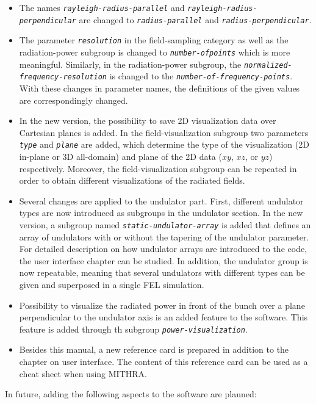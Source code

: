\begin{itemize}
	\item The names {\tt \em \small rayleigh-radius-parallel} and {\tt \em \small rayleigh-radius-perpendicular} are changed to {\tt \em \small radius-parallel} and {\tt \em \small radius-perpendicular}.
	\item The parameter {\tt \em \small resolution} in the field-sampling category as well as the radiation-power subgroup is changed to {\tt \em \small number-of\-points} which is more meaningful. Similarly, in the radiation-power subgroup, the {\tt \em \small normalized-frequency-resolution} is changed to the {\tt \em \small number-of-frequency-points}. With these changes in parameter names, the definitions of the given values are correspondingly changed.
	\item In the new version, the possibility to save 2D visualization data over Cartesian planes is added. In the field-visualization subgroup two parameters {\tt \em \small type} and {\tt \em \small plane} are added, which determine the type of the visualization (2D in-plane or 3D all-domain) and plane of the 2D data ($xy$, $xz$, or $yz$) respectively. Moreover, the field-visualization subgroup can be repeated in order to obtain different visualizations of the radiated fields.
	\item Several changes are applied to the undulator part. First, different undulator types are now introduced as subgroups in the undulator section. In the new version, a subgroup named {\em \tt \small static-undulator-array} is added that defines an array of undulators with or without the tapering of the undulator parameter. For detailed description on how undulator arrays are introduced to the code, the user interface chapter can be studied. In addition, the undulator group is now repeatable, meaning that several undulators with different types can be given and superposed in a single FEL simulation.
	\item Possibility to visualize the radiated power in front of the bunch over a plane perpendicular to the undulator axis is an added feature to the software. This feature is added through th subgroup {\tt \em \small power-visualization}.
	\item Besides this manual, a new reference card is prepared in addition to the chapter on user interface. The content of this reference card can be used as a cheat sheet when using MITHRA.
\end{itemize}
%
In future, adding the following aspects to the software are planned:
%

